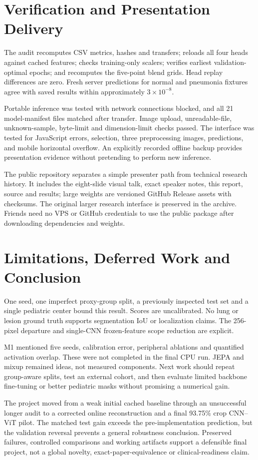 \documentclass[conference]{IEEEtran}
\begin{document}
\section{Verification and Presentation Delivery}
The audit recomputes CSV metrics, hashes and transfers; reloads all four heads against cached features; checks training-only scalers; verifies earliest validation-optimal epochs; and recomputes the five-point blend grids. Head replay differences are zero. Fresh server predictions for normal and pneumonia fixtures agree with saved results within approximately $3\times10^{-8}$.

Portable inference was tested with network connections blocked, and all 21 model-manifest files matched after transfer. Image upload, unreadable-file, unknown-sample, byte-limit and dimension-limit checks passed. The interface was tested for JavaScript errors, selection, three preprocessing images, predictions, and mobile horizontal overflow. An explicitly recorded offline backup provides presentation evidence without pretending to perform new inference.

The public repository separates a simple presenter path from technical research history. It includes the eight-slide visual talk, exact speaker notes, this report, source and results; large weights are versioned GitHub Release assets with checksums. The original larger research interface is preserved in the archive. Friends need no VPS or GitHub credentials to use the public package after downloading dependencies and weights.

\section{Limitations, Deferred Work and Conclusion}
One seed, one imperfect proxy-group split, a previously inspected test set and a single pediatric center bound this result. Scores are uncalibrated. No lung or lesion ground truth supports segmentation IoU or localization claims. The 256-pixel departure and single-CNN frozen-feature scope reduction are explicit.

M1 mentioned five seeds, calibration error, peripheral ablations and quantified activation overlap. These were not completed in the final CPU run. JEPA and mixup remained ideas, not measured components. Next work should repeat group-aware splits, test an external cohort, and then evaluate limited backbone fine-tuning or better pediatric masks without promising a numerical gain.

The project moved from a weak initial cached baseline through an unsuccessful longer audit to a corrected online reconstruction and a final 93.75\% crop CNN--ViT pilot. The matched test gain exceeds the pre-implementation prediction, but the validation reversal prevents a general robustness conclusion. Preserved failures, controlled comparisons and working artifacts support a defensible final project, not a global novelty, exact-paper-equivalence or clinical-readiness claim.
\end{document}
